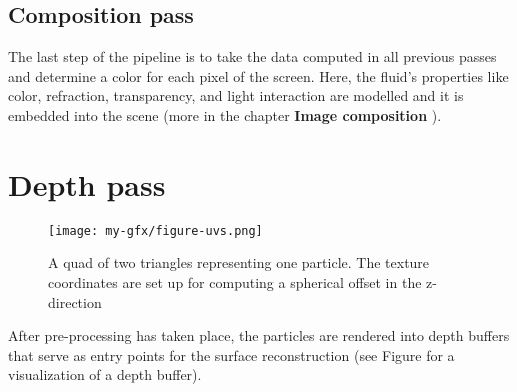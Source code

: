 \subsection{Composition pass}

The last step of the pipeline is to take the data computed in all previous passes and determine a color for each pixel of the screen. Here, the fluid's properties like color, refraction, transparency, and light interaction are modelled and it is embedded into the scene (more in the chapter \textbf{Image composition }).

\section{Depth pass}
\label{sec:depth}


\begin{figure}[h]
    \centering
    \texttt{[image: my-gfx/figure-uvs.png]}
    \caption{A quad of two triangles representing one particle. The texture coordinates are set up for computing a spherical offset in the z-direction}
    \label{fig:depth:uvs}
\end{figure}

After pre-processing has taken place, the particles are rendered into depth buffers that serve as entry points for the surface reconstruction (see Figure  for a visualization of a depth buffer).

